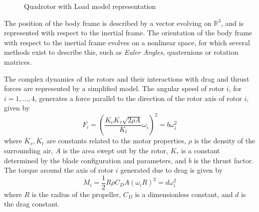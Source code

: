 \begin{figure}[h!]
	\centering
	\caption{Quadrotor with Load model representation\label{fig:mod.modelQRL}}
\end{figure}	

The position of the body frame is described by a vector evolving on $ \mathbb{R}^3 $, and is represented with respect to the inertial frame. The orientation of the body frame with respect to the inertial frame evolves on a nonlinear space, for which several methods exist to describe this, such as \textit{Euler Angles}, quaternions or rotation matrices. 

The complex dynamics of the rotors and their interactions with drag and thrust forces are represented by a simplified model. 
The angular speed  of rotor $ i $,  for $ i=1,\dots,4 $, generates a force  parallel to the direction of the rotor axis of rotor $ i $, given by
\begin{equation}\label{key}
F_i=\left( \frac{K_vK_\tau\sqrt{2\rho A}}{K_t}\omega_i\right)^2=b\omega_i^2 
\end{equation}
where $ K_v,K_t $ are constants related to the motor properties, $ \rho $ is the density of the surrounding air, $ A $ is the area swept out by the rotor, $ K_\tau $ is a constant determined by the blade configuration and parameters, and $ b $ is the thrust factor.\\
The torque around the axis of rotor $ i $ generated due to drag is given by
\begin{equation}\label{key}
M_{i}=\frac{1}{2}R\rho C_DA(\omega_iR)^2=d\omega_i^2
\end{equation}
where $ R $ is the radius of the propeller, $ C_D $ is a dimensionless constant, and $ d $ is the drag constant.


